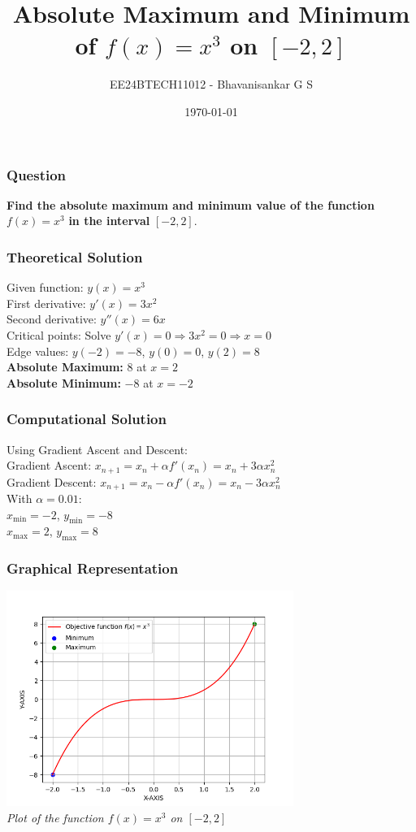 \documentclass{beamer}
\title{Absolute Maximum and Minimum of $f(x) = x^3$ on $[-2, 2]$}
\author{EE24BTECH11012 - Bhavanisankar G S}
\date{\today}
\begin{document}
\frame{\titlepage}

\begin{frame}
\frametitle{Question}
\textbf{Find the absolute maximum and minimum value of the function} $f(x) = x^3$ \textbf{in the interval} $[-2, 2]$.
\end{frame}

\begin{frame}
\frametitle{Theoretical Solution}
Given function: $y(x) = x^3$ \\[0.2cm]
First derivative: $y'(x) = 3x^2$ \\[0.2cm]
Second derivative: $y''(x) = 6x$ \\[0.2cm]
Critical points: Solve $y'(x) = 0 \Rightarrow 3x^2 = 0 \Rightarrow x = 0$ \\[0.2cm]
Edge values: $y(-2) = -8$, $y(0) = 0$, $y(2) = 8$ \\[0.2cm]
\textbf{Absolute Maximum:} $8$ at $x=2$ \\
\textbf{Absolute Minimum:} $-8$ at $x=-2$
\end{frame}

\begin{frame}
\frametitle{Computational Solution}
Using Gradient Ascent and Descent: \\[0.2cm]
Gradient Ascent: $x_{n+1} = x_n + \alpha f'(x_n) = x_n + 3\alpha x_n^2$ \\[0.2cm]
Gradient Descent: $x_{n+1} = x_n - \alpha f'(x_n) = x_n - 3\alpha x_n^2$ \\[0.2cm]
With $\alpha = 0.01$: \\
$x_{\text{min}} = -2$, $y_{\text{min}} = -8$ \\
$x_{\text{max}} = 2$, $y_{\text{max}} = 8$
\end{frame}

\begin{frame}
\frametitle{Graphical Representation}
\begin{center}
\includegraphics[width=0.7\textwidth]{fig.png} \\
\textit{Plot of the function $f(x) = x^3$ on $[-2, 2]$}
\end{center}
\end{frame}
\end{document}
